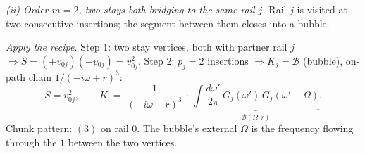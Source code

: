 \documentclass[11pt,a4paper]{article}
\begin{document}
\medskip
\textit{(ii) Order $m{=}2$, two stays both bridging to the same rail $j$.}
Rail $j$ is visited at two consecutive insertions; the segment between
them closes into a bubble.
\begin{center}
\end{center}
\textit{Apply the recipe.}
\;Step 1: two stay vertices, both with partner rail $j$
$\Rightarrow S = (+v_{0j})(+v_{0j}) = v_{0j}^{2}$.
\;Step 2: $p_{j}{=}2$ insertions $\Rightarrow K_{j}=\mathcal B$ (bubble),
on-path chain $1/(-i\omega+r)^{3}$:
\[
S = v_{0j}^{2},\qquad
K \;=\; \frac{1}{(-i\omega+r)^{3}}\,\cdot\,
\underbrace{\int\!\frac{d\omega'}{2\pi}\,
G_{j}(\omega')\,G_{j}(\omega'{-}\Omega)}_{\mathcal B(\Omega;r)}.
\]
Chunk pattern: $(3)$ on rail $0$. The bubble's external $\Omega$ is the
frequency flowing through the $1$ between the two vertices.
\end{document}
